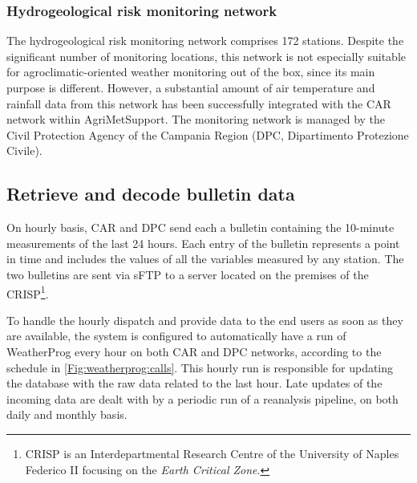 \documentclass[authoryear,preprint,review,12pt]{elsarticle}
\begin{document}
\subsubsection{Hydrogeological risk monitoring network\label{DPCNetwork}}
The hydrogeological risk monitoring network comprises %
172 stations. %
Despite the significant number of monitoring locations, this network is not especially suitable for agroclimatic-oriented weather monitoring out of the box, since its main purpose is different.
However, a substantial amount of air temperature and rainfall data from this network has been successfully integrated with the CAR network within AgriMetSupport.
The monitoring network is managed by the Civil Protection Agency of the Campania Region (DPC, Dipartimento Protezione Civile). %

\subsection{Retrieve and decode bulletin data}
On hourly basis, CAR and DPC send each a bulletin containing the 10-minute measurements of the last 24 hours.
Each entry of the bulletin represents a point in time and includes the values of all the variables measured by any station.
The two bulletins are sent via sFTP to a server located on the premises of the CRISP\footnote{CRISP is an Interdepartmental Research Centre of the University of Naples Federico II focusing on the \textit{Earth Critical Zone}.}.
 
To handle the hourly dispatch and provide data to the end users as soon as they are available, the system is configured to automatically have a run of WeatherProg every hour on both CAR and DPC networks, according to the schedule in \cref{Fig:weatherprog:calls}.
This hourly run is responsible for updating the database with the raw data related to the last hour.
Late updates of the incoming data are dealt with by a periodic run of a reanalysis pipeline, on both daily and monthly basis.
\end{document}
